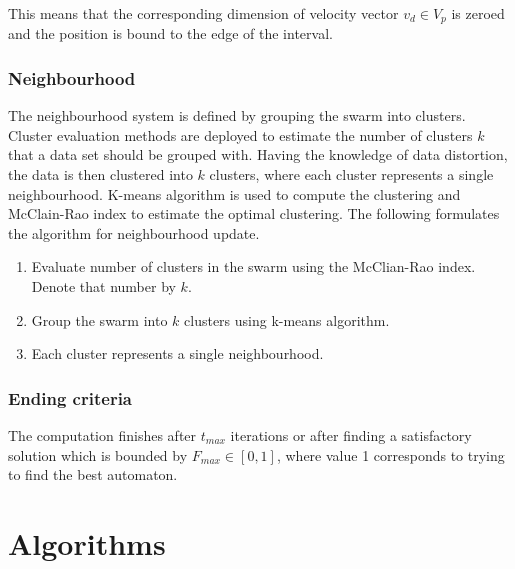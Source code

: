\documentclass{article}
\begin{document}
This means that the corresponding dimension of velocity vector $v_d \in V_p$ is zeroed and the position is bound to the edge of the interval.

\subsubsection{Neighbourhood}
The neighbourhood system is defined by grouping the swarm into clusters. Cluster evaluation methods are deployed to estimate the number of clusters $k$ that a data set should be grouped with. Having the knowledge of data distortion, the data is then clustered into $k$ clusters, where each cluster represents a single neighbourhood. K-means algorithm is used to compute the clustering and McClain-Rao index to estimate the optimal clustering. The following formulates the algorithm for neighbourhood update.

\begin{enumerate}
	\item Evaluate number of clusters in the swarm using the McClian-Rao index. Denote that number by $k$.
	\item Group the swarm into $k$ clusters using k-means algorithm.
	\item Each cluster represents a single neighbourhood.
\end{enumerate}


\subsubsection{Ending criteria}
The computation finishes after $t_{max}$ iterations or after finding a satisfactory solution which is bounded by $F_{max} \in [0,1]$, where value 1 corresponds to trying to find the best automaton.



\section{Algorithms} \label{section:Algorithms}
\end{document}

